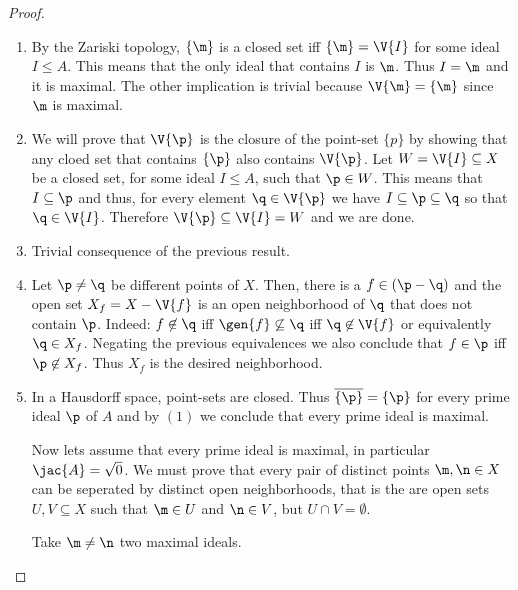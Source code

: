 \begin{proof}$\;$\\%
\begin{enumerate}
	\item By the Zariski topology, $\{\m\}$ is a closed set iff $\{\m\}=\V{I}$
	for some ideal $I\leq A$. This means that the only ideal that contains
	$I$ is $\m$. Thus $I=\m$ and it is maximal. The other implication is trivial
	because $\V{\m}=\{\m\}$ since $\m$ is maximal.
	
	\item We will prove that $\V{\p}$ is the closure of the point-set $\{p\}$ by
	showing that any cloed set that contains $\{\p\}$ also contains $\V{\p}$. Let
	$W=\V{I}\subseteq X$ be a closed set, for some ideal $I\leq A$, such that
	$\p\in W$. This means that $I\subseteq\p$ and thus, for every element $\q\in\V{\p}$
	we have $I\subseteq\p\subseteq\q$ so that $\q\in\V{I}$. Therefore
	$\V{\p}\subseteq\V{I}=W$ and we are done.
	
	\item Trivial consequence of the previous result.
	
	\item Let $\p\neq\q$ be different points of $X$. Then, there is a $f\in(\p-\q)$
	and the open set $X_f=X-\V{f}$ is an open neighborhood of $\q$ that does not
	contain $\p$. Indeed: $f\not\in\q$ iff $\gen{f}\not\subseteq\q$ iff $\q\not\in\V{f}$
	or equivalently $\q\in X_f$. Negating the previous equivalences we also conclude
	that $f\in\p$ iff $\p\not\in X_f$. Thus $X_f$ is the desired neighborhood.
	
	\item In a Hausdorff space, point-sets are closed. Thus $\overline{\{\p\}}=\{\p\}$
	for every prime ideal $\p$ of $A$ and by $(1)$ we conclude that every prime ideal
	is maximal.
	
	Now lets assume that every prime ideal is maximal, in particular $\jac{A}=\sqrt{0}$.
	We must prove that every pair of distinct points $\m,\n\in X$ can be seperated by
	distinct open neighborhoods, that is the are open sets $U,V\subseteq X$ such that
	$\m\in U$ and $\n\in V$, but $U\cap V=\emptyset$.
	
	Take $\m\neq\n$ two maximal ideals.
	
	
\end{enumerate}
%
\end{proof}%

